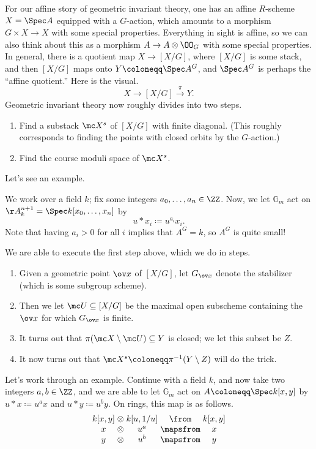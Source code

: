 \documentclass{article}
\begin{document}
For our affine story of geometric invariant theory, one has an affine $R$-scheme $X=\Spec A$ equipped with a $G$-action, which amounts to a morphism $G\times X\to X$ with some special properties. Everything in sight is affine, so we can also think about this as a morphism $A\to A\otimes\OO_G$ with some special properties. In general, there is a quotient map $X\to [X/G]$, where $[X/G]$ is some stack, and then $[X/G]$ maps onto $Y\coloneqq\Spec A^G$, and $\Spec A^G$ is perhaps the ``affine quotient.'' Here is the visual.
\[X\to[X/G]\stackrel\pi\to Y.\]
Geometric invariant theory now roughly divides into two steps.
\begin{enumerate}
    \item Find a substack $\mc X^s$ of $[X/G]$ with finite diagonal. (This roughly corresponds to finding the points with closed orbits by the $G$-action.)
    \item Find the course moduli space of $\mc X^s$.
\end{enumerate}
Let's see an example.
\begin{example}
    We work over a field $k$; fix some integers $a_0,\ldots,a_n\in\ZZ$. Now, we let $\mathbb G_m$ act on $\AA_k^{n+1}=\Spec k[x_0,\ldots,x_n]$ by
    \[u*x_i\coloneqq u^{a_i}x_i.\]
    Note that having $a_i>0$ for all $i$ implies that $A^G=k$, so $A^G$ is quite small!
\end{example}
We are able to execute the first step above, which we do in steps.
\begin{enumerate}
    \item Given a geometric point $\ov x$ of $[X/G]$, let $G_{\ov x}$ denote the stabilizer (which is some subgroup scheme).
    \item Then we let $\mc U\subseteq[X/G]$ be the maximal open subscheme containing the $\ov x$ for which $G_{\ov x}$ is finite.
    \item It turns out that $\pi(\mc X\setminus\mc U)\subseteq Y$ is closed; we let this subset be $Z$.
    \item It now turns out that $\mc X^s\coloneqq\pi^{-1}(Y\setminus Z)$ will do the trick.
\end{enumerate}
Let's work through an example. Continue with a field $k$, and now take two integers $a,b\in\ZZ$, and we are able to let $\mathbb G_m$ act on $A\coloneqq\Spec k[x,y]$ by $u*x\coloneqq u^ax$ and $u*y\coloneqq u^by$. On rings, this map is as follows.
\[\arraycolsep=1.4pt\begin{array}{cccccc}
    k[x,y] &\otimes& k[u,1/u] &\from& k[x,y] \\
    x &\otimes& u^a &\mapsfrom& x \\
    y &\otimes& u^b &\mapsfrom& y
\end{array}\]
\end{document}
